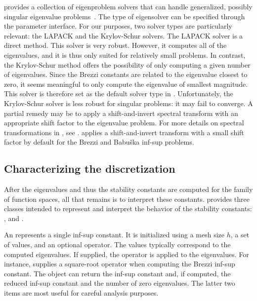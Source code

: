 \slepc{} provides a collection of eigenproblem solvers that can handle
generalized, possibly singular eigenvalue
problems~\citep{HernandezRomanVidal2005, HernandezRomanRomeroEtAl2009}. The type
of eigensolver can be specified through the \dolfin{} parameter
interface. For our purposes, two solver types are particularly
relevant: the LAPACK and the Krylov-Schur solvers.  The LAPACK solver
is a direct method. This solver is very robust. However, it computes
all of the eigenvalues, and it is thus only suited for relatively
small problems. In contrast, the Krylov-Schur method offers the
possibility of only computing a given number of eigenvalues. Since the
Brezzi constants are related to the eigenvalue closest to zero, it
seems meaningful to only compute the eigenvalue of smallest
magnitude. This solver is therefore set as the default solver type in
\rognesascot. Unfortunately, the Krylov-Schur solver is less robust
for singular problems: it may fail to converge. A partial remedy may
be to apply a shift-and-invert spectral transform with an appropriate
shift factor to the eigenvalue problem. For more details on spectral
transformations in \slepc{}, see
\citet{HernandezRomanRomeroEtAl2009}. \rognesascot{} applies a
shift-and-invert transform with a small shift factor by default for
the Brezzi and Babu\v ska inf-sup problems.

\subsection{Characterizing the discretization}

After the eigenvalues and thus the stability constants are computed
for the family of function spaces, all that remains is to interpret
these constants. \rognesascot{} provides three classes intended to represent
and interpret the behavior of the stability constants:
,  and
.

An  represents a single inf-sup
constant. It is initialized using a mesh size $h$, a set of values,
and an optional operator. The values typically correspond to the
computed eigenvalues. If supplied, the operator is applied to the
eigenvalues.  For instance, \rognesascot{} supplies a square-root operator
when computing the Brezzi inf-sup constant. The object can return the
inf-sup constant and, if computed, the reduced inf-sup constant and
the number of zero eigenvalues. The latter two items are most useful
for careful analysis purposes.

